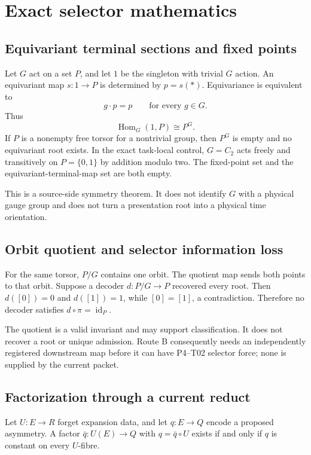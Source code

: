 \documentclass[11pt]{article}
\begin{document}
\section{Exact selector mathematics}

\subsection{Equivariant terminal sections and fixed points}

Let $G$ act on a set $P$, and let $1$ be the singleton with trivial $G$ action.
An equivariant map $s:1\to P$ is determined by $p=s(*)$.  Equivariance is
equivalent to
\[
  g\cdot p=p \qquad \text{for every }g\in G.
\]
Thus
\[
  \operatorname{Hom}_{G}(1,P)\cong P^G.
\]
If $P$ is a nonempty free torsor for a nontrivial group, then $P^G$ is empty
and no equivariant root exists.  In the exact task-local control, $G=C_2$ acts
freely and transitively on $P=\{0,1\}$ by addition modulo two.  The fixed-point
set and the equivariant-terminal-map set are both empty.

This is a source-side symmetry theorem.  It does not identify $G$ with a
physical gauge group and does not turn a presentation root into a physical
time orientation.

\subsection{Orbit quotient and selector information loss}

For the same torsor, $P/G$ contains one orbit.  The quotient map sends both
points to that orbit.  Suppose a decoder $d:P/G\to P$ recovered every root.
Then $d([0])=0$ and $d([1])=1$, while $[0]=[1]$, a contradiction.  Therefore
no decoder satisfies $d\circ\pi=\operatorname{id}_P$.

The quotient is a valid invariant and may support classification.  It does not
recover a root or unique admission.  Route B consequently needs an
independently registered downstream map before it can have P4--T02 selector
force; none is supplied by the current packet.

\subsection{Factorization through a current reduct}

Let $U:E\to R$ forget expansion data, and let $q:E\to Q$ encode a proposed
asymmetry.  A factor $\bar q:U(E)\to Q$ with $q=\bar q\circ U$ exists if and
only if $q$ is constant on every $U$-fibre.
\end{document}
